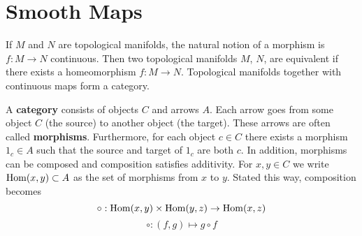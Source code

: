 \section{Smooth Maps}
If $M$ and $N$ are topological manifolds, the natural notion of a 
morphism is $f : M \to N$ continuous. Then two topological manifolds
$M$, $N$, are equivalent if there exists a homeomorphism $f : M \to N$. 
Topological manifolds together with continuous maps form a category.

\begin{definition}
A \textbf{category} consists of objects $C$ and arrows $A$. Each arrow
goes from some object $C$ (the source) to another object (the target).
These arrows are often called \textbf{morphisms}. Furthermore, for each
object $c \in C$ there exists a morphism $1_c \in A$ such that the source
and target of $1_c$ are both $c$. In addition, morphisms can be composed
and composition satisfies additivity. For $x, y \in C$ we write 
$\operatorname{Hom}(x,y) \subset A$ as the set of morphisms from $x$ to $y$. Stated this
way, composition becomes
\[ \circ : \operatorname{Hom}(x,y) \times \operatorname{Hom}(y,z) \to \operatorname{Hom}(x,z) \]
\[ \circ : (f,g) \mapsto g \circ f \]
\end{definition}
